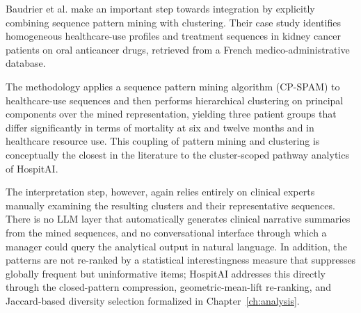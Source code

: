 Baudrier et al. \cite{baudrier2022} make an important step towards integration by explicitly combining sequence pattern mining with clustering. Their case study identifies homogeneous healthcare-use profiles and treatment sequences in kidney cancer patients on oral anticancer drugs, retrieved from a French medico-administrative database.

The methodology applies a sequence pattern mining algorithm (CP-SPAM) to healthcare-use sequences and then performs hierarchical clustering on principal components over the mined representation, yielding three patient groups that differ significantly in terms of mortality at six and twelve months and in healthcare resource use. This coupling of pattern mining and clustering is conceptually the closest in the literature to the cluster-scoped pathway analytics of HospitAI.

The interpretation step, however, again relies entirely on clinical experts manually examining the resulting clusters and their representative sequences. There is no LLM layer that automatically generates clinical narrative summaries from the mined sequences, and no conversational interface through which a manager could query the analytical output in natural language. In addition, the patterns are not re-ranked by a statistical interestingness measure that suppresses globally frequent but uninformative items; HospitAI addresses this directly through the closed-pattern compression, geometric-mean-lift re-ranking, and Jaccard-based diversity selection formalized in Chapter~\ref{ch:analysis}.

